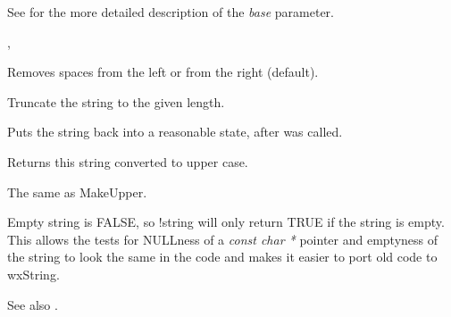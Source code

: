See  for the more detailed
description of the {\it base} parameter.


,\\

\label{wxstringtrim}


Removes spaces from the left or from the right (default).

\label{wxstringtruncate}


Truncate the string to the given length.

\label{wxstringungetwritebuf}


Puts the string back into a reasonable state, after
\rtfsp{} was called.

\label{wxstringupper}


Returns this string converted to upper case.

\label{wxstringuppercase}


The same as MakeUpper.

\label{wxstringoperatornot}


Empty string is FALSE, so !string will only return TRUE if the string is empty.
This allows the tests for NULLness of a {\it const char *} pointer and emptyness
of the string to look the same in the code and makes it easier to port old code
to wxString.

See also .

\label{wxstringoperatorassign}



